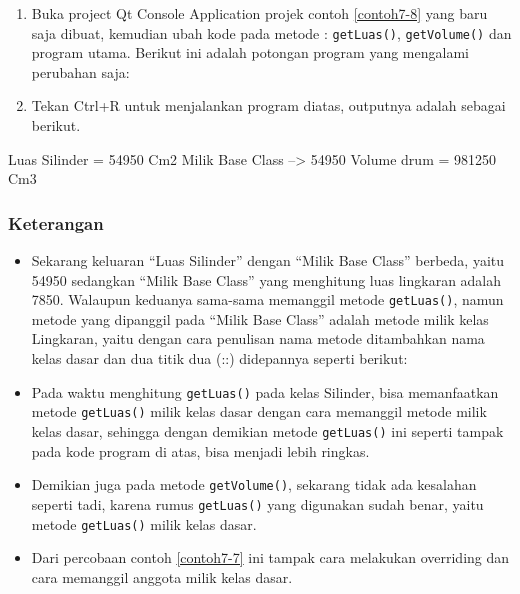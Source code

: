 \begin{enumerate}

\item
 Buka project Qt Console Application projek contoh \ref{contoh7-8} yang baru saja
 dibuat, kemudian ubah kode pada metode : \texttt{getLuas()},
 \texttt{getVolume()} dan program utama. Berikut ini adalah potongan
 program yang mengalami perubahan saja:


\item
 Tekan Ctrl+R untuk menjalankan program diatas, outputnya adalah
 sebagai berikut.
\end{enumerate}

\begin{lcverbatim}
Luas Silinder = 54950 Cm2
Milik Base Class --> 54950
Volume drum = 981250 Cm3
\end{lcverbatim}

\subsubsection*{Keterangan}

\begin{itemize}
\item
 Sekarang keluaran ``Luas Silinder'' dengan ``Milik Base Class''
 berbeda, yaitu 54950 sedangkan ``Milik Base Class'' yang menghitung
 luas lingkaran adalah 7850. Walaupun keduanya sama-sama memanggil
 metode \texttt{getLuas()}, namun metode yang dipanggil pada ``Milik
 Base Class'' adalah metode milik kelas Lingkaran, yaitu dengan cara
 penulisan nama metode ditambahkan nama kelas dasar dan dua titik dua
 (::) didepannya seperti berikut:


\item
 Pada waktu menghitung \texttt{getLuas()} pada kelas Silinder, bisa
 memanfaatkan metode \texttt{getLuas()} milik kelas dasar dengan cara
 memanggil metode milik kelas dasar, sehingga dengan demikian metode
 \texttt{getLuas()} ini seperti tampak pada kode program di atas, bisa
 menjadi lebih ringkas.
\item
 Demikian juga pada metode \texttt{getVolume()}, sekarang tidak ada
 kesalahan seperti tadi, karena rumus \texttt{getLuas()} yang digunakan
 sudah benar, yaitu metode \texttt{getLuas()} milik kelas dasar.
\item
 Dari percobaan contoh \ref{contoh7-7} ini tampak cara melakukan overriding dan cara
 memanggil anggota milik kelas dasar.
\end{itemize}

